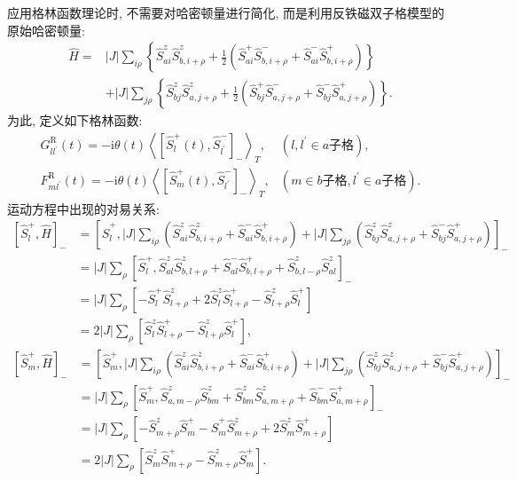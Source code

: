 应用格林函数理论时, 不需要对哈密顿量进行简化, 而是利用反铁磁双子格模型的原始哈密顿量:
\begin{align}
\hat H=&|J| \sum_{i \rho}\left\{\hat{S}_{a i}^{z} \hat{S}_{b, i+\rho}^{z}+\frac{1}{2}\left(\hat{S}_{a i}^{+} \hat{S}_{b, i+\rho}^{-}+\hat{S}_{a i}^{-} \hat{S}_{b, i+\rho}^{+}\right)\right\}\nonumber\\
&+|J| \sum_{j \rho}\left\{\hat{S}_{b j}^{z} \hat{S}_{a, j+\rho}^{z}+\frac{1}{2}\left(\hat{S}_{b j}^{+} \hat{S}_{a, j+\rho}^{-}+\hat{S}_{b j}^{-} \hat{S}_{a, j+\rho}^{+}\right)\right\}.
\end{align}
为此, 定义如下格林函数:
\begin{align}
G_{l l^{\prime}}^\mathrm{R}(t)=-\mathrm{i} \theta(t)\left\langle\left[\hat{S}_{l}^{+}(t), \hat{S}_{l^{\prime}}^{-}\right]_-\right\rangle_{T}, &\left(l, l^{\prime} \in a \text {子格}\right), \nonumber\\
F_{m l^{\prime}}^\mathrm{R}(t)=-\mathrm{i} \theta(t)\left\langle\left[\hat{S}_{m}^{+}(t), \hat{S}_{l^{\prime}}^{-}\right]_-\right\rangle_{T}, &\left(m \in b \text {子格}, l^{\prime} \in a \text {子格}\right) .
\end{align}
运动方程中出现的对易关系:
\begin{align}
{\left[\hat{S}_{l}^{+}, \hat{H}\right]_- } &=\left[\hat{S}_{l}^{+},|J| \sum_{i \rho}\left(\hat{S}_{a i}^{z} \hat{S}_{b, i+\rho}^{z}+\hat{S}_{a i}^{-} \hat{S}_{b ,i+\rho}^{+}\right)+|J| \sum_{j \rho}\left(\hat{S}_{b j}^{z} \hat{S}_{a, j+\rho}^{z}+\hat{S}_{b j}^{-} \hat{S}_{a ,j+\rho}^{+}\right)\right]_-\nonumber \\
&=|J| \sum_{\rho}\left[\hat{S}_{l}^{+}, \hat{S}_{a l}^{z} \hat{S}_{b ,l+\rho}^{z}+\hat{S}_{a l}^{-} \hat{S}_{b, l+\rho}^{+}+\hat{S}_{b ,l-\rho}^{z} \hat{S}_{a l}^{z}\right]_- \nonumber\\
&=|J| \sum_{\rho}\left[-\hat{S}_{l}^{+} \hat{S}_{l+\rho}^{z}+2 \hat{S}_{l}^{z} \hat{S}_{l+\rho}^{+}-\hat{S}_{l+\rho}^{z} \hat{S}_{l}^{+}\right]\nonumber \\
&=2|J| \sum_{\rho}\left[\hat{S}_{l}^{z} \hat{S}_{l+\rho}^{+}-\hat{S}_{l+\rho}^{z} \hat{S}_{l}^{+}\right] ,
\end{align}
\begin{align}
{\left[\hat{S}_{m}^{+}, \hat{H}\right]_- } &=\left[\hat{S}_{m}^{+},|J| \sum_{i \rho}\left(\hat{S}_{a i}^{z} \hat{S}_{b, i+\rho}^{z}+\hat{S}_{a i}^{-} \hat{S}_{b, i+\rho}^{+}\right)+|J| \sum_{j \rho}\left(\hat{S}_{b j}^{z} \hat{S}_{a, j+\rho}^{z}+\hat{S}_{b j}^{-} \hat{S}_{a, j+\rho}^{+}\right)\right]_-\nonumber\\
&=|J| \sum_{\rho}\left[\hat{S}_{m}^{+}, \hat{S}_{a ,m-\rho}^{z} \hat{S}_{b m}^{z}+\hat{S}_{b m}^{z} \hat{S}_{a, m+\rho}^{z}+\hat{S}_{b m}^{-} \hat{S}_{a, m+\rho}^{+}\right]_-\nonumber\\
&=|J| \sum_{\rho}\left[-\hat{S}_{m+\rho}^{z} \hat{S}_{m}^{+}-\hat{S}_{m}^{+} \hat{S}_{m+\rho}^{z}+2 \hat{S}_{m}^{z} \hat{S}_{m+\rho}^{+}\right]\nonumber \\
&=2|J| \sum_{\rho}\left[\hat{S}_{m}^{z} \hat{S}_{m+\rho}^{+}-\hat{S}_{m+\rho}^{z} \hat{S}_{m}^{+}\right] .
\end{align}
